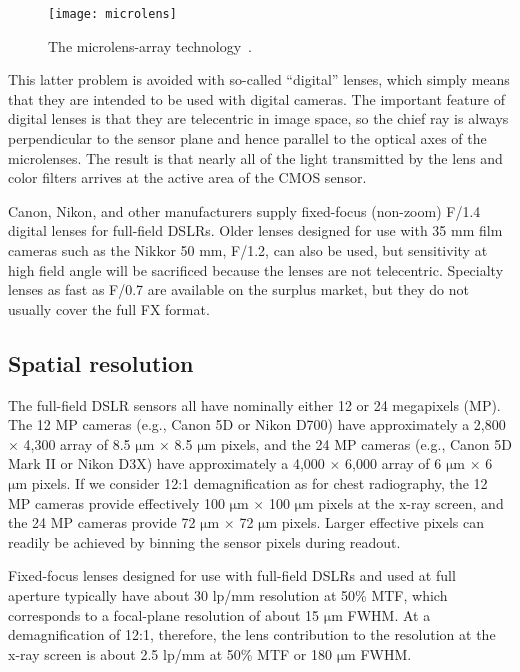 \begin{figure}[h]
\centering
\texttt{[image: microlens]}
\caption{The microlens-array technology~\citep{microlensfig}.}
\label{fig:microlensarray}
\end{figure}

This latter problem is avoided with so-called ``digital'' lenses, which simply means that they are intended to be used with digital cameras. The important feature of digital lenses is that they are telecentric in image space, so the chief ray is always perpendicular to the sensor plane and hence parallel to the optical axes of the microlenses. The result is that nearly all of the light transmitted by the lens and color filters arrives at the active area of the CMOS sensor. 

Canon, Nikon, and other manufacturers supply fixed-focus (non-zoom) F/1.4 digital lenses for full-field DSLRs. Older lenses designed for use with 35 mm film cameras such as the Nikkor 50 mm, F/1.2, can also be used, but sensitivity at high field angle will be sacrificed because the lenses are not telecentric. Specialty lenses as fast as F/0.7 are available on the surplus market, but they do not usually cover the full FX format.

\subsection{Spatial resolution}
\label{subsect:spatial_resolution}
The full-field DSLR sensors all have nominally either 12 or 24 megapixels (MP). The 12 MP cameras (e.g., Canon 5D or Nikon D700) have approximately a 2,800 $\times$ 4,300 array of 8.5 $\mathrm{\mu m}$ $\times$ 8.5 $\mathrm{\mu m}$ pixels, and the 24 MP cameras (e.g., Canon 5D Mark II or Nikon D3X) have approximately a 4,000 $\times$ 6,000 array of 6 $\mathrm{\mu m}$ $\times$ 6 $\mathrm{\mu m}$ pixels. If we consider 12:1 demagnification as for chest radiography, the 12 MP cameras provide effectively 100 $\mathrm{\mu m}$ $\times$ 100 $\mathrm{\mu m}$ pixels at the x-ray screen, and the 24 MP cameras provide 72 $\mathrm{\mu m}$ $\times$ 72 $\mathrm{\mu m}$ pixels. Larger effective pixels can readily be achieved by binning the sensor pixels during readout.

Fixed-focus lenses designed for use with full-field DSLRs and used at full aperture typically have about 30 lp/mm resolution at 50\% MTF, which corresponds to a focal-plane resolution of about 15 $\mathrm{\mu m}$ FWHM. At a demagnification of 12:1, therefore, the lens contribution to the resolution at the x-ray screen is about 2.5 lp/mm at 50\% MTF or 180 $\mathrm{\mu m}$ FWHM.

